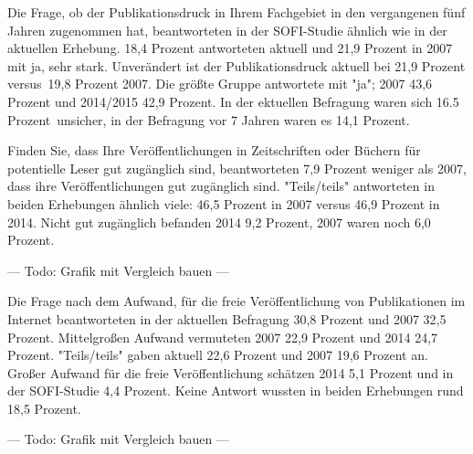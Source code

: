 Die Frage, ob der Publikationsdruck in Ihrem Fachgebiet in den vergangenen fünf Jahren zugenommen hat, beantworteten in der SOFI-Studie ähnlich wie in der aktuellen Erhebung. 18,4 Prozent antworteten aktuell und 21,9 Prozent in 2007 mit ja, sehr stark. Unverändert ist der Publikationsdruck aktuell bei 21,9 Prozent versus 19,8 Prozent 2007. Die größte Gruppe antwortete mit "ja"; 2007 43,6 Prozent und 2014/2015 42,9 Prozent. In der ektuellen Befragung waren sich 16.5 Prozent unsicher, in der Befragung vor 7 Jahren waren es 14,1 Prozent.

Finden Sie, dass Ihre Veröffentlichungen in Zeitschriften oder Büchern für potentielle Leser gut zugänglich sind, beantworteten 7,9 Prozent weniger als 2007, dass ihre Veröffentlichungen gut zugänglich sind. "Teils/teils" antworteten in beiden Erhebungen ähnlich viele: 46,5 Prozent in 2007 versus 46,9 Prozent in 2014. Nicht gut zugänglich befanden 2014 9,2 Prozent, 2007 waren noch 6,0 Prozent.

--- Todo: Grafik mit Vergleich bauen ---

Die Frage nach dem Aufwand, für die freie Veröffentlichung von Publikationen im Internet beantworteten in der aktuellen Befragung 30,8 Prozent und 2007 32,5 Prozent. Mittelgroßen Aufwand vermuteten 2007 22,9 Prozent und 2014 24,7 Prozent. "Teils/teils" gaben aktuell 22,6 Prozent und 2007 19,6 Prozent an. Großer Aufwand für die freie Veröffentlichung schätzen 2014 5,1 Prozent und in der SOFI-Studie 4,4 Prozent. Keine Antwort wussten in beiden Erhebungen rund 18,5 Prozent.

--- Todo: Grafik mit Vergleich bauen ---

